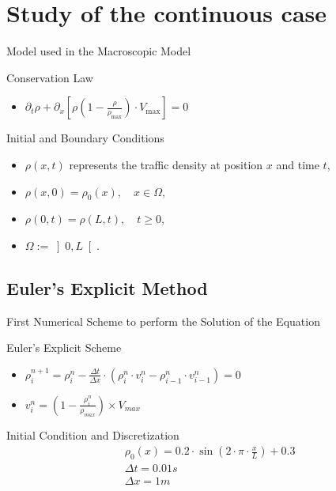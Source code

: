 \documentclass{beamer}
\begin{document}
\section{Study of the continuous case}
\begin{frame}{Model used in the Macroscopic Model}
	\begin{alertblock}{Conservation Law}
		\begin{itemize}
			\item $\partial_t\rho + \partial_x\left[ \rho\left( 1-\frac{\rho}{\rho_{\text{max}}}\right) \cdot V_{\text{max}}\right] = 0 $
		\end{itemize}
	\end{alertblock}
	\begin{block}{Initial and Boundary Conditions}
		\begin{itemize}
			\item $\rho(x,t)$ represents the traffic density at position $x$ and time $t$,
			\item $\rho(x,0) = \rho_0(x), \quad x \in \Omega,$
			\item $\rho(0,t) = \rho(L,t), \quad t \geq 0$,
			\item $\Omega := \left] 0,L\right[ $.
		\end{itemize}
	\end{block}
\end{frame}

\subsection{Euler's Explicit Method}
\begin{frame}{First Numerical Scheme to perform the Solution of the Equation}
	\begin{alertblock}{Euler's Explicit Scheme}
		\begin{itemize}
			\item $\rho_{i}^{n+1} = \rho_i^n - \frac{\Delta t}{\Delta x} \cdot \left(\rho_i^n \cdot v_i^n - \rho_{i-1}^n \cdot v_{i-1}^n \right)
					=0$
		
			\item $v_i^n = \left( 1 - \frac{\rho_i^n}{\rho_{max}}\right)  \times V_{max}$
		\end{itemize}
	\end{alertblock}
	\begin{block}{Initial Condition and Discretization}
		\[
		\boxed{
			\begin{aligned}
				&\rho_0(x)=0.2 \cdot \sin\left(2 \cdot \pi \cdot \frac{x}{L}\right) + 0.3 \\
				&\Delta t = 0.01s \\
				&\Delta x = 1m
			\end{aligned}
		}
		\]
	\end{block}
\end{frame}
\end{document}
